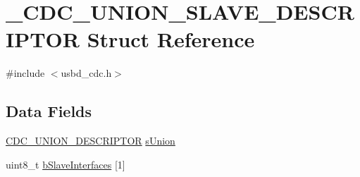 \hypertarget{struct__CDC__UNION__1SLAVE__DESCRIPTOR}{\section{\-\_\-\-C\-D\-C\-\_\-\-U\-N\-I\-O\-N\-\_\-S\-L\-A\-V\-E\-\_\-\-D\-E\-S\-C\-R\-I\-P\-T\-O\-R Struct Reference}
\label{struct__CDC__UNION__1SLAVE__DESCRIPTOR}
}


{\ttfamily \#include $<$usbd\-\_\-cdc.\-h$>$}

\subsection*{Data Fields}
\begin{DoxyCompactItemize}
\item 
\hyperlink{usbd__cdc_8h_abae3cc6753424f8383c5d46f674975b9}{C\-D\-C\-\_\-\-U\-N\-I\-O\-N\-\_\-\-D\-E\-S\-C\-R\-I\-P\-T\-O\-R} \hyperlink{struct__CDC__UNION__1SLAVE__DESCRIPTOR_a80ee9f0210ba596bfbeef771955c26a6}{s\-Union}
\item 
uint8\-\_\-t \hyperlink{struct__CDC__UNION__1SLAVE__DESCRIPTOR_a4a4b8383cd96d9ba6fa83b35bb32c94b}{b\-Slave\-Interfaces} \mbox{[}1\mbox{]}
\end{DoxyCompactItemize}



